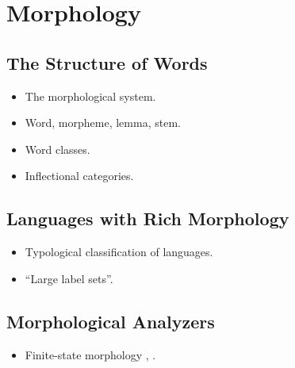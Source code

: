 \chapter{Morphology}

\section{The Structure of Words}
\begin{itemize}
\item The morphological system.
\item Word, morpheme, lemma, stem.
\item Word classes.
\item Inflectional categories.
\end{itemize}
\section{Languages with Rich Morphology}
\begin{itemize}
\item Typological classification of languages.
\item ``Large label sets''.
\end{itemize}

\section{Morphological Analyzers}
\begin{itemize}
\item Finite-state morphology \citep{Koskenniemi1984}, \citep{Kaplan1994}.
\end{itemize}